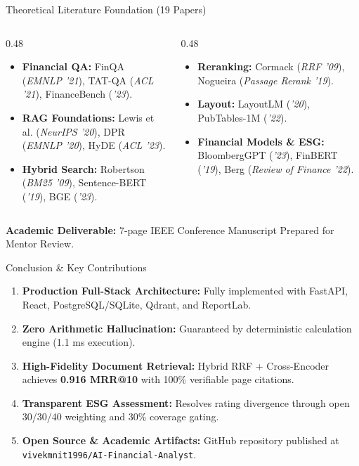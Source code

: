 \documentclass[aspectratio=169,10pt]{beamer}
\begin{document}
\begin{frame}{Theoretical Literature Foundation (19 Papers)}
\begin{columns}[T]
\begin{column}{0.48\textwidth}
\begin{itemize}
    \item \textbf{Financial QA:} FinQA (\textit{EMNLP '21}), TAT-QA (\textit{ACL '21}), FinanceBench (\textit{'23}).
    \item \textbf{RAG Foundations:} Lewis et al. (\textit{NeurIPS '20}), DPR (\textit{EMNLP '20}), HyDE (\textit{ACL '23}).
    \item \textbf{Hybrid Search:} Robertson (\textit{BM25 '09}), Sentence-BERT (\textit{'19}), BGE (\textit{'23}).
\end{itemize}
\end{column}
\begin{column}{0.48\textwidth}
\begin{itemize}
    \item \textbf{Reranking:} Cormack (\textit{RRF '09}), Nogueira (\textit{Passage Rerank '19}).
    \item \textbf{Layout:} LayoutLM (\textit{'20}), PubTables-1M (\textit{'22}).
    \item \textbf{Financial Models \& ESG:} BloombergGPT (\textit{'23}), FinBERT (\textit{'19}), Berg (\textit{Review of Finance '22}).
\end{itemize}
\end{column}
\end{columns}
\vspace{0.3cm}
\begin{center}
\textbf{Academic Deliverable:} 7-page IEEE Conference Manuscript Prepared for Mentor Review.
\end{center}
\end{frame}

\begin{frame}{Conclusion \& Key Contributions}
\begin{enumerate}
    \item \textbf{Production Full-Stack Architecture:} Fully implemented with FastAPI, React, PostgreSQL/SQLite, Qdrant, and ReportLab.
    \item \textbf{Zero Arithmetic Hallucination:} Guaranteed by deterministic calculation engine (1.1 ms execution).
    \item \textbf{High-Fidelity Document Retrieval:} Hybrid RRF + Cross-Encoder achieves \textbf{0.916 MRR@10} with 100\% verifiable page citations.
    \item \textbf{Transparent ESG Assessment:} Resolves rating divergence through open 30/30/40 weighting and 30\% coverage gating.
    \item \textbf{Open Source \& Academic Artifacts:} GitHub repository published at \texttt{vivekmnit1996/AI-Financial-Analyst}.
\end{enumerate}
\end{frame}
\end{document}
